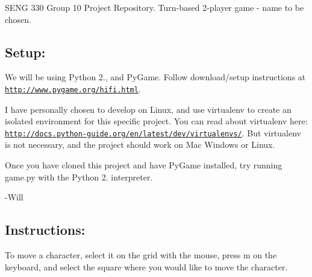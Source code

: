 S\-E\-N\-G 330 Group 10 Project Repository. Turn-\/based 2-\/player game -\/ name to be chosen.

\subsection*{Setup\-: }

We will be using Python 2., and Py\-Game. Follow download/setup instructions at \href{http://www.pygame.org/hifi.html}{\tt http\-://www.\-pygame.\-org/hifi.\-html}.

I have personally chosen to develop on Linux, and use virtualenv to create an isolated environment for this specific project. You can read about virtualenv here\-: \href{http://docs.python-guide.org/en/latest/dev/virtualenvs/}{\tt http\-://docs.\-python-\/guide.\-org/en/latest/dev/virtualenvs/}. But virtualenv is not necessary, and the project should work on Mac Windows or Linux.

Once you have cloned this project and have Py\-Game installed, try running game.\-py with the Python 2. interpreter.

-\/\-Will

\subsection*{Instructions\-: }

To move a character, select it on the grid with the mouse, press m on the keyboard, and select the square where you would like to move the character. 